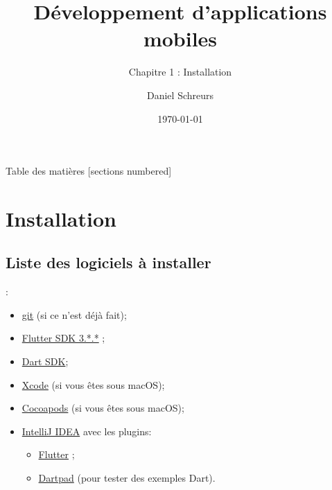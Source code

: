 \documentclass[10pt]{beamer}
\title{Développement d'applications mobiles}
\subtitle{Chapitre 1 : Installation}
\date{\today}
\author{Daniel Schreurs}
\institute{Haute École de la Province de Liège}
\begin{document}
\maketitle

\begin{frame}[allowframebreaks]{Table des matières}
    [sections numbered]
    \tableofcontents
\end{frame}

\section{Installation}

\subsection{Liste des logiciels à installer}
\begin{frame}[fragile,t]{\secname : \subsecname}
    \begin{itemize}
        \item \href{https://git-scm.com/downloads}{git} (si ce n'est déjà fait);
        \item \href{https://flutter.dev/docs/get-started/install}{Flutter SDK 3.*.*} ;
        \item \href{https://dart.dev/get-dart}{Dart SDK};
        \item \href{https://itunes.apple.com/us/app/xcode/id497799835}{Xcode} (si vous êtes sous macOS);
        \item \href{https://guides.cocoapods.org/using/getting-started.html#installation}{Cocoapods} (si vous êtes sous macOS);
        \item \href{https://www.jetbrains.com/fr-fr/idea/download/#section=mac}{IntelliJ IDEA} avec les plugins:
              \begin{itemize}
                  \item \href{https://plugins.jetbrains.com/plugin/9212-flutter}{Flutter} ;
                  \item \href{https://plugins.jetbrains.com/plugin/16602-embedded-dartpad}{Dartpad} (pour tester des exemples Dart).
              \end{itemize}
    \end{itemize}
\end{frame}
\end{document}
